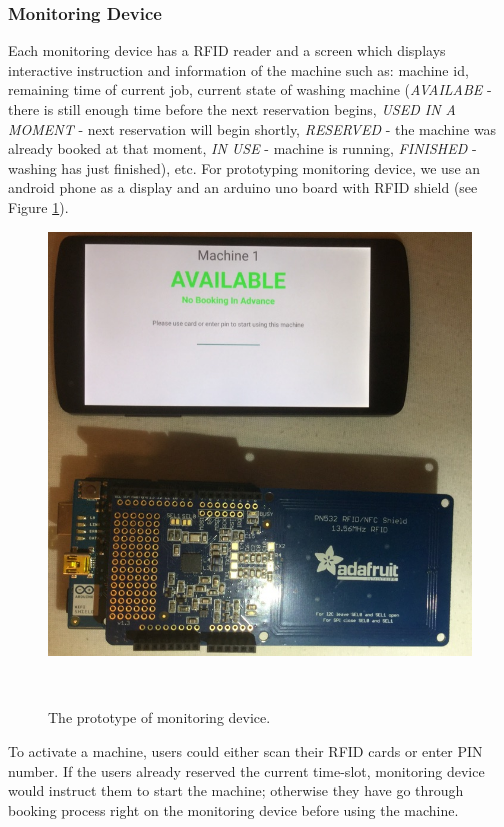 \subsubsection{Monitoring Device}
Each monitoring device has a RFID reader and a screen which displays interactive instruction and information of the machine such as: machine id, remaining time of current job, current state of washing machine (\emph{AVAILABE} - there is still enough time before the next reservation begins, \emph{USED IN A MOMENT} - next reservation will begin shortly, \emph{RESERVED} - the machine was already booked at that moment, \emph{IN USE} - machine is running, \emph{FINISHED} - washing has just finished), etc.
 For prototyping monitoring device, we use an android phone as a display and an arduino uno board with RFID shield (see Figure \ref{fig:figure2}).
\begin{figure}[h]
\centering
  \includegraphics[width=0.7\columnwidth]{figures/Monitoring}
  \caption{The prototype of monitoring device.}~\label{fig:figure2}
\end{figure}
To activate a machine, users could either scan their RFID cards or enter PIN number. If the users already reserved the current time-slot, monitoring device would instruct them to start the machine; otherwise they have go through booking process right on the monitoring device before using the machine.

